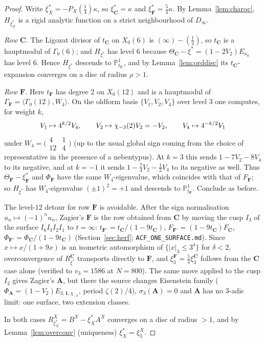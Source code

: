 \begin{proof}
Write $\xi^*_X=-P_X(\tfrac14)\kappa$, so $\xi^*_{\mathbf C}=\kappa$ and
$\xi^*_{\mathbf F}=\tfrac54\kappa$.  By Lemma~\ref{lem:charoc}, $H_{\xi^*_X}$ is a
rigid analytic function on a strict neighbourhood of $D_\infty$.

\emph{Row $\mathbf C$.}  The Ligozat divisor of $t_{\mathbf C}$ on $X_0(6)$ is
$(\infty)-(\tfrac12)$, so $t_{\mathbf C}$ is a hauptmodul of $\Gamma_0(6)$; and
$H_{\xi^*}$ has level $6$ because $\Theta_{\mathbf C}-\xi^*=(1-2V_2)E_{\kappa_0}$ has
level $6$.  Hence $H_{\xi^*}$ descends to $\mathbb P^1_{t_{\mathbf C}}$, and by
Lemma~\ref{lem:orddisc} its $t_{\mathbf C}$-expansion converges on a disc of radius
$\rho>1$.

\emph{Row $\mathbf F$.}  Here $t_{\mathbf F}$ has degree $2$ on $X_0(12)$ and is a
hauptmodul of $\Gamma_{\mathbf F}=\langle\Gamma_0(12),W_4\rangle$.  On the oldform
basis $\{V_1,V_2,V_4\}$ over level $3$ one computes, for weight $k$,
\[
V_1\mapsto 4^{k/2}V_4,\qquad V_2\mapsto\chi_{-3}(2)V_2=-V_2,\qquad V_4\mapsto4^{-k/2}V_1
\]
under $W_4=\bigl(\begin{smallmatrix}4&1\\12&4\end{smallmatrix}\bigr)$
(up to the usual global sign coming from the choice of representative in the
presence of a nebentypus).  At $k=3$ this sends $1-7V_2-8V_4$ to its negative, and
at $k=-1$ it sends $1-\tfrac74V_2-\tfrac12V_4$ to its negative as well.  Thus
$\Theta_{\mathbf F}-\xi^*_{\mathbf F}$ and $\Phi_{\mathbf F}$ have the same $W_4$-eigenvalue,
which coincides with that of $F_{\mathbf F}$; so $H_{\xi^*}$ has $W_4$-eigenvalue
$(\pm1)^2=+1$ and descends to $\mathbb P^1_{t_{\mathbf F}}$.  Conclude as before.

\begin{remark}\label{rem:cuspmove}
The level-$12$ detour for row $\mathbf F$ is avoidable. After the sign normalisation $u_n\mapsto(-1)^nu_n$, Zagier's $\mathbf F$ is the row obtained from $\mathbf C$ by moving the cusp $I_3$ of the surface $I_6I_3I_2I_1$ to $t=\infty$: $t_{\mathbf F'}=t_{\mathbf C}/(1-9t_{\mathbf C})$, $F_{\mathbf F'}=(1-9t_{\mathbf C})F_{\mathbf C}$, $\Phi_{\mathbf F'}=\Phi_{\mathbf C}/(1-9t_{\mathbf C})$ (Section~\ref{sec:herf}; \texttt{ACF\_ONE\_SURFACE.md}). Since $x\mapsto x/(1+9x)$ is an isometric automorphism of $\{|x|_3\le3^{\delta}\}$ for $\delta<2$, overconvergence of $R^{\mathbf C}_{\xi^*}$ transports directly to $\mathbf F$, and $\xi_3^{\mathbf F}=\tfrac54\xi_3^{\mathbf C}$ follows from the $\mathbf C$ case alone (verified to $v_3=1586$ at $N=800$). The same move applied to the cusp $I_2$ gives Zagier's $\mathbf A$, but there the source changes Eisenstein family ($\Phi_{\mathbf A}=(1-V_2)E_{3,\mathbf 1,\chi_{-3}}$, period $\zeta(2)/4$), $\sigma_3(\mathbf A)=0$ and $\mathbf A$ has no $3$-adic limit: one surface, two extension classes.
\end{remark}

In both cases $R^X_{\xi^*_X}=B^X-\xi^*_XA^X$ converges on a disc of radius $>1$,
and by Lemma~\ref{lem:overconv} (uniqueness) $\xi^*_X=\xi^X_3$.
\end{proof}

